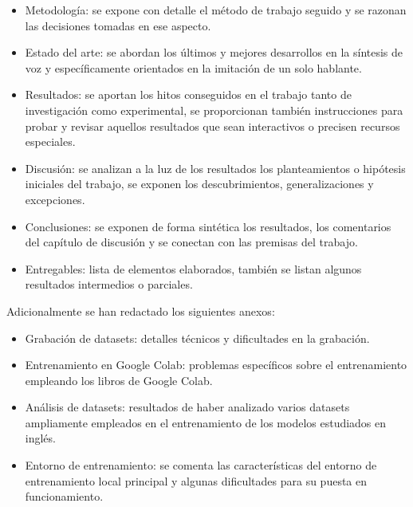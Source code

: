 \begin{itemize}
    \item Metodología: se expone con detalle el método de trabajo seguido y se razonan las decisiones tomadas en ese aspecto.
    \item Estado del arte: se abordan los últimos y mejores desarrollos en la síntesis de voz y específicamente orientados en la imitación de un solo hablante.
    \item Resultados: se aportan los hitos conseguidos en el trabajo tanto de investigación como experimental, se proporcionan también instrucciones para probar y revisar aquellos resultados que sean interactivos o precisen recursos especiales.
    \item Discusión: se analizan a la luz de los resultados los planteamientos o hipótesis iniciales del trabajo, se exponen los descubrimientos, generalizaciones y excepciones.
    \item Conclusiones: se exponen de forma sintética los resultados, los comentarios del capítulo de discusión y se conectan con las premisas del trabajo.
    \item Entregables: lista de elementos elaborados, también se listan algunos resultados intermedios o parciales.
\end{itemize}

Adicionalmente se han redactado los siguientes anexos:

\begin{itemize}
    \item Grabación de datasets: detalles técnicos y dificultades en la grabación.
    \item Entrenamiento en Google Colab: problemas específicos sobre el entrenamiento empleando los libros de Google Colab.
    \item Análisis de datasets: resultados de haber analizado varios datasets ampliamente empleados en el entrenamiento de los modelos estudiados en inglés.
    \item Entorno de entrenamiento: se comenta las características del entorno de entrenamiento local principal y algunas dificultades para su puesta en funcionamiento.
\end{itemize}

\newpage 